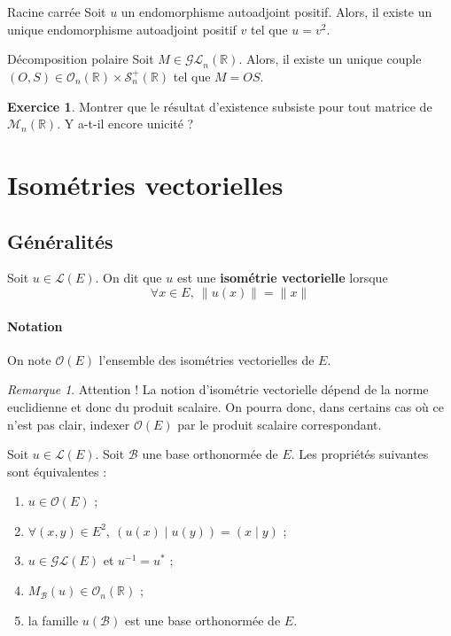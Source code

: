 \documentclass[french]{article}
\newcommand{\R}{\mathbb{R}}
\newcommand{\st}{^*}
\newcommand{\inv}{^{-1}}
\theoremstyle{plain}
\theoremstyle{definition}
\newtheorem{exo}{Exercice}
\theoremstyle{remark}
\newtheorem*{rmq}{Remarque}
\begin{document}
\begin{thm}{Racine carrée}
	Soit $u$ un endomorphisme autoadjoint positif. Alors, il existe un unique endomorphisme autoadjoint positif $v$ tel que $u=v^2$.
\end{thm}

\begin{thm}{Décomposition polaire}
	Soit $M\in\mathcal{GL}_n(\R)$. Alors, il existe un unique couple $(O,S)\in\mathcal{O}_n(\R)\times\mathcal{S}_n^{+}(\R)$ tel que $M=OS$.
\end{thm}

\begin{exo}
	Montrer que le résultat d'existence subsiste pour tout matrice de $\mathcal{M}_n(\R)$. Y a-t-il encore unicité ?
\end{exo}

\section{Isométries vectorielles}

\subsection{Généralités}

\begin{dfn}
	Soit $u\in\mathcal{L}(E)$. On dit que $u$ est une \textbf{isométrie vectorielle} lorsque $$\forall x\in E,\ \lVert u(x)\rVert=\lVert x\rVert$$
\end{dfn}

\paragraph{Notation} On note $\mathcal{O}(E)$ l'ensemble des isométries vectorielles de $E$.

\begin{rmq}
	Attention ! La notion d'isométrie vectorielle dépend de la norme euclidienne et donc du produit scalaire. On pourra donc, dans certains cas où ce n'est pas clair, indexer $\mathcal{O}(E)$ par le produit scalaire correspondant.
\end{rmq}

\begin{thm}{}
	Soit $u\in\mathcal{L}(E)$. Soit $\mathcal{B}$ une base orthonormée de $E$. Les propriétés suivantes sont équivalentes : \begin{enumerate}[label=(\roman*)]
		\item $u\in\mathcal{O}(E)$ ;
		\item $\forall (x,y)\in E^2,\ \left(u(x)\mid u(y)\right)=(x\mid y)$ ;
		\item $u\in\mathcal{GL}(E)$ et $u\inv=u\st$ ;
		\item $M_\mathcal{B}(u)\in\mathcal{O}_n(\R)$ ;
		\item la famille $u(\mathcal{B})$ est une base orthonormée de $E$.
	\end{enumerate}
\end{thm}
\end{document}
